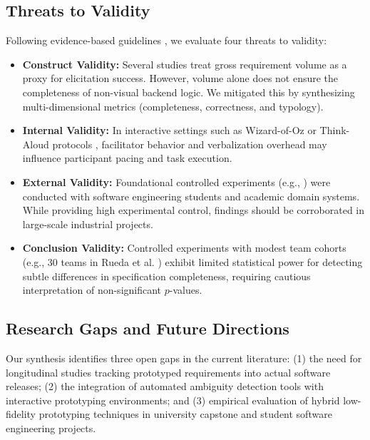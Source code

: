\subsection{Threats to Validity}
Following evidence-based guidelines \cite{kitchenham2007guidelines}, we evaluate four threats to validity:
\begin{itemize}
    \item \textbf{Construct Validity:} Several studies treat gross requirement volume as a proxy for elicitation success. However, volume alone does not ensure the completeness of non-visual backend logic. We mitigated this by synthesizing multi-dimensional metrics (completeness, correctness, and typology).
    \item \textbf{Internal Validity:} In interactive settings such as Wizard-of-Oz or Think-Aloud protocols \cite{abad2018loud}, facilitator behavior and verbalization overhead may influence participant pacing and task execution.
    \item \textbf{External Validity:} Foundational controlled experiments (e.g., \cite{rueda2020requirements, diaz2021gender, uv2023empirical}) were conducted with software engineering students and academic domain systems. While providing high experimental control, findings should be corroborated in large-scale industrial projects.
    \item \textbf{Conclusion Validity:} Controlled experiments with modest team cohorts (e.g., 30 teams in Rueda et al. \cite{rueda2020requirements}) exhibit limited statistical power for detecting subtle differences in specification completeness, requiring cautious interpretation of non-significant $p$-values.
\end{itemize}

\subsection{Research Gaps and Future Directions}
Our synthesis identifies three open gaps in the current literature: (1) the need for longitudinal studies tracking prototyped requirements into actual software releases; (2) the integration of automated ambiguity detection tools with interactive prototyping environments; and (3) empirical evaluation of hybrid low-fidelity prototyping techniques in university capstone and student software engineering projects.
